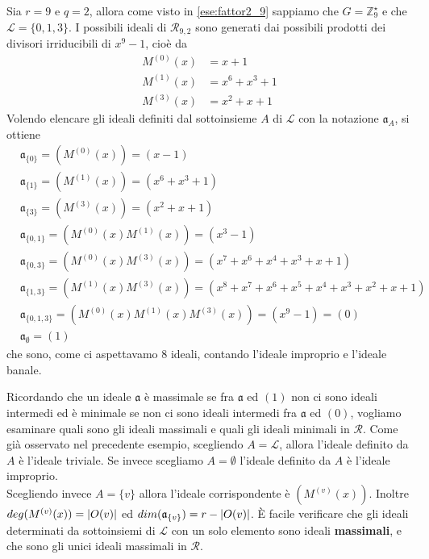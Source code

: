 \begin{esempio}
   Sia $r = 9$ e $q = 2$, allora come visto in \ref{ese:fattor2_9} sappiamo che $ G = \mathbb{Z}_{9}^{\star} $ e che $\mathscr{L} = \lbrace 0,1,3 \rbrace$. I possibili ideali di $\mathcal{R}_{9,2} $ sono generati dai possibili prodotti dei divisori irriducibili di $x^9-1$, cioè da 
   \begin{align*}
      M^{(0)}(x)&= x+1\\
      M^{(1)}(x) &= x^6+x^3+1\\
      M^{(3)}(x) &= x^2+x+1
   \end{align*}
   Volendo elencare gli ideali definiti dal sottoinsieme $A$ di $\mathscr{L} $ con la notazione $\mathfrak{a}_{A}$, si ottiene
   \begin{align*}
      &\mathfrak{a}_{\lbrace 0 \rbrace} = (M^{(0)}(x)) = (x-1) \\
      &\mathfrak{a}_{\lbrace 1 \rbrace} = (M^{(1)}(x)) = (x^6+x^3+1) \\
      &\mathfrak{a}_{\lbrace 3 \rbrace} = (M^{(3)}(x)) = (x^2+x+1) \\
      &\mathfrak{a}_{\lbrace 0,1 \rbrace} = (M^{(0)}(x)M^{(1)}(x)) = (x^3 -1) \\
      &\mathfrak{a}_{\lbrace 0,3 \rbrace} = (M^{(0)}(x)M^{(3)}(x)) = (x^7 + x^6 + x^4 + x^3 + x + 1) \\
      &\mathfrak{a}_{\lbrace 1,3 \rbrace} 
                    = (M^{(1)}(x)M^{(3)}(x)) = (x^8 +x^7 +x^6 + x^5 + x^4 + x^3 + x^2 + x + 1) \\
      &\mathfrak{a}_{\lbrace 0,1,3 \rbrace} = (M^{(0)}(x)M^{(1)}(x)M^{(3)}(x)) = (x^9 -1) = (0) \\
      &\mathfrak{a}_{\emptyset} = (1) 
   \end{align*}
   che sono, come ci aspettavamo $8$ ideali, contando l'ideale improprio e l'ideale banale.
\end{esempio}
Ricordando che un ideale $\mathfrak{a}$ è massimale se fra $\mathfrak{a}$ ed $(1)$ non ci sono ideali intermedi ed è minimale se non ci sono ideali intermedi fra $\mathfrak{a}$ ed $(0)$, vogliamo esaminare quali sono gli ideali massimali e quali gli ideali minimali in $\mathcal{R}$. Come già osservato nel precedente esempio, scegliendo $A = \mathscr{L}$, allora l'ideale definito da $A$ è l'ideale triviale. Se invece scegliamo $A = \emptyset$ l'ideale definito da $A$ è l'ideale improprio. \\
Scegliendo invece $A = \lbrace v \rbrace$ allora l'ideale corrispondente è $(M^{(v)}(x))$. Inoltre $deg(M^{(v)}(x)) = \arrowvert O(v) \arrowvert$ ed $dim(\mathfrak{a}_{\lbrace v \rbrace}) = r - \arrowvert O(v) \arrowvert$. È facile verificare che gli ideali determinati da sottoinsiemi di $\mathscr{L}$ con un solo elemento sono ideali {\bf massimali}, e che sono gli unici ideali massimali in $\mathcal{R}$.\\
